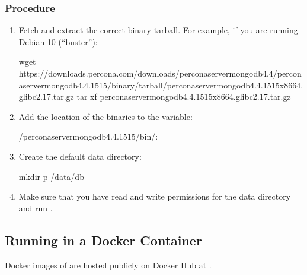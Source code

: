 \documentclass[letterpaper,10pt,english]{sphinxmanual}
\begin{document}
\subsubsection{Procedure}
\label{\detokenize{install/tarball:procedure}}\begin{enumerate}
%
\item {} 
\sphinxAtStartPar
Fetch and extract the correct binary tarball. For example, if you
are running Debian 10 (“buster”):

\begin{sphinxVerbatim}[commandchars=\\\{\}]
\PYGZdl{} wget https://downloads.percona.com/downloads/percona\PYGZhy{}server\PYGZhy{}mongodb\PYGZhy{}4.4/percona\PYGZhy{}server\PYGZhy{}mongodb\PYGZhy{}4.4.15\PYGZhy{}15/binary/tarball/percona\PYGZhy{}server\PYGZhy{}mongodb\PYGZhy{}4.4.15\PYGZhy{}15\PYGZhy{}x86\PYGZus{}64.glibc2.17.tar.gz
\PYGZdl{} tar \PYGZhy{}xf percona\PYGZhy{}server\PYGZhy{}mongodb\PYGZhy{}4.4.15\PYGZhy{}15\PYGZhy{}x86\PYGZus{}64.glibc2.17.tar.gz
\end{sphinxVerbatim}

\item {} 
\sphinxAtStartPar
Add the location of the binaries to the  variable:

\begin{sphinxVerbatim}[commandchars=\\\{\}]
\PYGZdl{}  \PYGZti{}/percona\PYGZhy{}server\PYGZhy{}mongodb\PYGZhy{}4.4.15\PYGZhy{}15/bin/:
\end{sphinxVerbatim}

\item {} 
\sphinxAtStartPar
Create the default data directory:

\begin{sphinxVerbatim}[commandchars=\\\{\}]
\PYGZdl{} mkdir \PYGZhy{}p /data/db
\end{sphinxVerbatim}

\item {} 
\sphinxAtStartPar
Make sure that you have read and write permissions for the data
directory and run .

\end{enumerate}


\subsection{Running  in a Docker Container}
\label{\detokenize{install/docker:running-psmdb-in-a-docker-container}}\label{\detokenize{install/docker:docker}}\label{\detokenize{install/docker::doc}}
\sphinxAtStartPar
Docker images of  are hosted publicly on Docker Hub at
.
\end{document}
